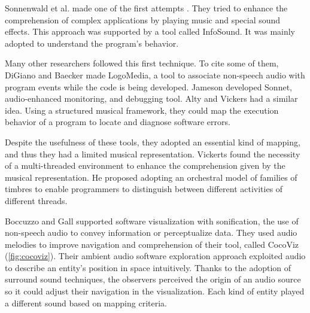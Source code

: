 Sonnenwald et al. made one of the first attempts \cite{Sonnenwald1990}.
They tried to enhance the comprehension of complex applications by playing music and special sound effects. 
This approach was supported by a tool called InfoSound.
It was mainly adopted to understand the program's behavior. 

Many other researchers followed this first technique. To cite some of them, DiGiano and Baecker \cite{DiGiano1993} made LogoMedia, a tool to associate non-speech
 audio with program events while the code is being developed. 
Jameson \cite{Jameson1994} developed Sonnet, audio-enhanced monitoring, and debugging tool.  
Alty and Vickers \cite{Vickers2003} had a similar idea. Using a structured musical framework, they could map the execution behavior of a program to locate and diagnose software errors. 
 
Despite the usefulness of these tools, they adopted an essential kind of mapping, and thus they had a limited musical representation. 
Vickerts \cite{Vickers2004} found the necessity of a multi-threaded environment to enhance the comprehension given by the musical representation. 
He proposed adopting an orchestral model of families of timbres to enable programmers to distinguish between different activities of different threads.

Boccuzzo and Gall \cite{Boccuzzo2009} supported software visualization with sonification, the use of non-speech audio to convey information or perceptualize data. 
They used audio melodies to improve navigation and comprehension of their tool, called CocoViz (\autoref{fig:cocoviz}).
Their ambient audio software exploration approach exploited audio to describe an entity's position in space intuitively. 
Thanks to the adoption of surround sound techniques, the observers perceived the origin of an audio source so it could adjust their navigation in the visualization.
Each kind of entity played a different sound based on mapping criteria.

